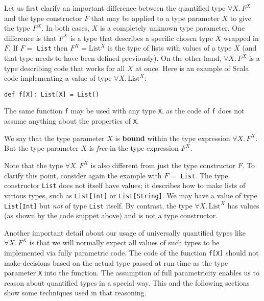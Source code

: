 Let us first clarify an important difference between the quantified
type $\forall X.\,F^{X}$ and the type constructor $F$ that may be
applied to a type parameter $X$ to give the type $F^{X}$. In both
cases, $X$ is a completely unknown type parameter. One difference
is that $F^{X}$ is a type that describes a specific chosen type $X$
wrapped in $F$. If $F=$ \lstinline!List! then $F^{X}=\text{List}^{X}$
is the type of lists with values of a type $X$ (and that type needs
to have been defined previously). On the other hand, $\forall X.\,F^{X}$
is a type describing code that works for all $X$ at once. Here is
an example of Scala code implementing a value of type $\forall X.\,\text{List}^{X}$:
\begin{lstlisting}
def f[X]: List[X] = List()
\end{lstlisting}
The same function \lstinline!f! may be used with any type \lstinline!X!,
as the code of \lstinline!f! does not assume anything about the properties
of \lstinline!X!. 

We say that the type parameter $X$ is \textbf{bound}
within the type expression $\forall X.\,F^{X}$. But the type parameter
$X$ is \emph{free} in the type expression $F^{X}$.

Note that the type $\forall X.\,F^{X}$ is also different from just
the type constructor $F$. To clarify this point, consider again the
example with $F=$ \lstinline!List!. The type constructor \lstinline!List!
does not itself have values; it describes how to make lists of various
types, such as \lstinline!List[Int]! or \lstinline!List[String]!.
We may have a value of type \lstinline!List[Int]! but \emph{not}
of type \lstinline!List! itself. By contrast, the type $\forall X.\,\text{List}^{X}$
has values (as shown by the code snippet above) and is not a type
constructor.

Another important detail about our usage of universally quantified
types like $\forall X.\,F^{X}$ is that we will normally expect all
values of such types to be implemented via fully parametric code.
The code of the function \lstinline!f[X]! should not make decisions
based on the actual type passed at run time as the type parameter
\lstinline!X! into the function. The assumption of full parametricity
enables us to reason about quantified types in a special way. This
and the following sections show some techniques used in that reasoning.

